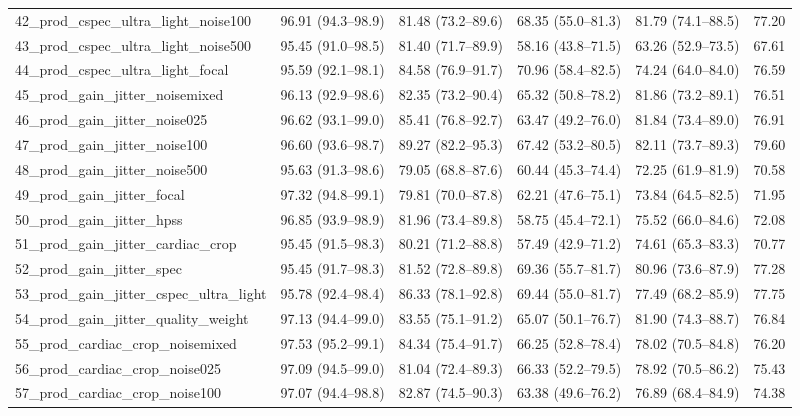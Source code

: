 \documentclass[10pt]{article}
\begin{document}
\begin{longtable}{lccccr}
42\_prod\_cspec\_ultra\_light\_noise100 & 96.91 (94.3--98.9) & 81.48 (73.2--89.6) & 68.35 (55.0--81.3) & 81.79 (74.1--88.5) & 77.20 \\
43\_prod\_cspec\_ultra\_light\_noise500 & 95.45 (91.0--98.5) & 81.40 (71.7--89.9) & 58.16 (43.8--71.5) & 63.26 (52.9--73.5) & 67.61 \\
44\_prod\_cspec\_ultra\_light\_focal & 95.59 (92.1--98.1) & 84.58 (76.9--91.7) & 70.96 (58.4--82.5) & 74.24 (64.0--84.0) & 76.59 \\
45\_prod\_gain\_jitter\_noisemixed & 96.13 (92.9--98.6) & 82.35 (73.2--90.4) & 65.32 (50.8--78.2) & 81.86 (73.2--89.1) & 76.51 \\
46\_prod\_gain\_jitter\_noise025 & 96.62 (93.1--99.0) & 85.41 (76.8--92.7) & 63.47 (49.2--76.0) & 81.84 (73.4--89.0) & 76.91 \\
47\_prod\_gain\_jitter\_noise100 & 96.60 (93.6--98.7) & 89.27 (82.2--95.3) & 67.42 (53.2--80.5) & 82.11 (73.7--89.3) & 79.60 \\
48\_prod\_gain\_jitter\_noise500 & 95.63 (91.3--98.6) & 79.05 (68.8--87.6) & 60.44 (45.3--74.4) & 72.25 (61.9--81.9) & 70.58 \\
49\_prod\_gain\_jitter\_focal & 97.32 (94.8--99.1) & 79.81 (70.0--87.8) & 62.21 (47.6--75.1) & 73.84 (64.5--82.5) & 71.95 \\
50\_prod\_gain\_jitter\_hpss & 96.85 (93.9--98.9) & 81.96 (73.4--89.8) & 58.75 (45.4--72.1) & 75.52 (66.0--84.6) & 72.08 \\
51\_prod\_gain\_jitter\_cardiac\_crop & 95.45 (91.5--98.3) & 80.21 (71.2--88.8) & 57.49 (42.9--71.2) & 74.61 (65.3--83.3) & 70.77 \\
52\_prod\_gain\_jitter\_spec & 95.45 (91.7--98.3) & 81.52 (72.8--89.8) & 69.36 (55.7--81.7) & 80.96 (73.6--87.9) & 77.28 \\
53\_prod\_gain\_jitter\_cspec\_ultra\_light & 95.78 (92.4--98.4) & 86.33 (78.1--92.8) & 69.44 (55.0--81.7) & 77.49 (68.2--85.9) & 77.75 \\
54\_prod\_gain\_jitter\_quality\_weight & 97.13 (94.4--99.0) & 83.55 (75.1--91.2) & 65.07 (50.1--76.7) & 81.90 (74.3--88.7) & 76.84 \\
55\_prod\_cardiac\_crop\_noisemixed & 97.53 (95.2--99.1) & 84.34 (75.4--91.7) & 66.25 (52.8--78.4) & 78.02 (70.5--84.8) & 76.20 \\
56\_prod\_cardiac\_crop\_noise025 & 97.09 (94.5--99.0) & 81.04 (72.4--89.3) & 66.33 (52.2--79.5) & 78.92 (70.5--86.2) & 75.43 \\
57\_prod\_cardiac\_crop\_noise100 & 97.07 (94.4--98.8) & 82.87 (74.5--90.3) & 63.38 (49.6--76.2) & 76.89 (68.4--84.9) & 74.38 \\

\end{longtable}
\end{document}
